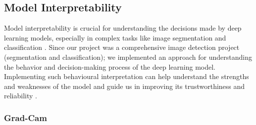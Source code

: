 \documentclass[12pt]{article}
\begin{document}
\clearpage
\newpage

\subsection{Model Interpretability}
Model interpretability is crucial for understanding the decisions made by deep learning models, especially in complex tasks like image segmentation and classification \cite{Gildenblat2024}. 
Since our project was a comprehensive image detection project (segmentation and classification); we implemented an approach for understanding the behavior and decision-making process of the deep learning model. Implementing such behavioural interpretation can help understand the strengths and weaknesses of the model and guide us in improving its trustworthiness and reliability \cite{Gildenblat2024}.

\subsubsection{Grad-Cam}
\end{document}

